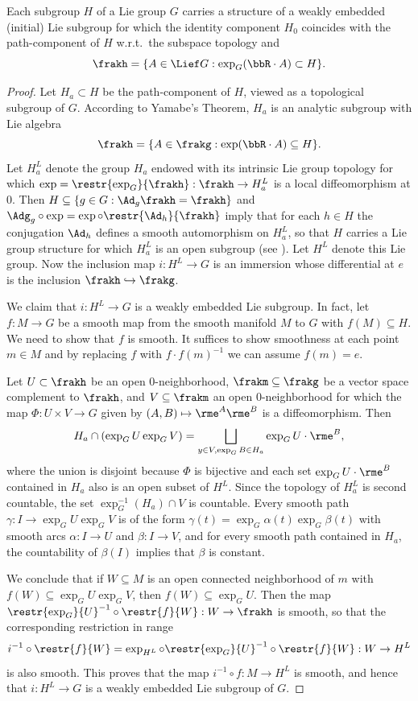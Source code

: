 \begin{thm}\label{thm initial subgroup}
    Each subgroup $H$ of a Lie group $G$ carries a structure of a weakly embedded (initial) Lie subgroup for which the identity component $H_0$ coincides with the path-component of $H$ w.r.t.\ the subspace topology and
    \[\frakh=\{A\in\Lief G: \exp_G(\bbR\cdot A)\subset H\}.\]
\end{thm}
\begin{proof}
    Let $H_a\subset H$ be the path-component of $H$, viewed as a topological subgroup of $G$. According to Yamabe's Theorem, $H_a$ is an analytic subgroup with Lie algebra
    \[\frakh=\{A\in\frakg:\exp(\bbR\cdot A)\subseteq H\}.\]
    Let $H_a^L$ denote the group $H_a$ endowed with its intrinsic Lie group topology for which $\exp=\restr{\exp_G}{\frakh}:\frakh\to H_a^L$ is a local diffeomorphism at $0$. Then $H\subseteq\{g\in G:\Ad_g\frakh=\frakh\}$ and $\Adg_g\circ \exp=\exp\circ\restr{\Ad_h}{\frakh}$ imply that for each $h\in H$ the conjugation $\Ad_h$ defines a smooth automorphism on $H_a^L$, so that $H$ carries a Lie group structure for which $H_a^L$ is an open subgroup (see \cite[Thm.~9.4.4, Cor.~9.4.5]{HN}). Let $H^L$ denote this Lie group. Now the inclusion map $i:H^L\to G$ is an immersion whose differential at $e$ is the inclusion $\frakh\hookrightarrow\frakg$.

    We claim that $i:H^L\to G$ is a weakly embedded Lie subgroup. In fact, let $f:M\to G$ be a smooth map from the smooth manifold $M$ to $G$ with $f(M)\subseteq H$. We need to show that $f$ is smooth. It suffices to show smoothness at each point $m\in M$ and by replacing $f$ with $f\cdot f(m)^{-1}$ we can assume $f(m)=e$.

    Let $U\subset \frakh$ be an open 0-neighborhood, $\frakm\subseteq\frakg$ be a vector space complement to $\frakh$, and $V\subseteq \frakm$ an open 0-neighborhood for which the map $\varPhi:U\times V\to G$ given by $(A,B)\mapsto \rme^A\rme^B$ is a diffeomorphism. Then 
    \[H_a\cap(\exp_G U\exp_G V)=\bigsqcup_{y\in V,\exp_G B\in H_a}\exp_GU \cdot \rme^B,\]
    where the union is disjoint because $\varPhi$ is bijective and each set $\exp_GU\cdot \rme^B$ contained in $H_a$ also is an open subset of $H^L$. Since the topology of $H^L_a$ is second countable, the set $\exp^{-1}_G(H_a)\cap V$ is countable. Every smooth path $\gamma:I\to \exp_GU\exp_GV$ is of the form $\gamma(t)=\exp_G\alpha(t)\exp_G\beta(t)$ with smooth arcs $\alpha:I\to U$ and $\beta:I\to V$, and for every smooth path contained in $H_a$, the countability of $\beta(I)$ implies that $\beta$ is constant.

    We conclude that if $W\subseteq M$ is an open connected neighborhood of $m$ with $f(W)\subseteq \exp_GU\exp_GV$, then $f(W)\subseteq \exp_GU$. Then the map $\restr{\exp_G}{U}^{-1}\circ \restr{f}{W}:W\to\frakh$ is smooth, so that the corresponding restriction in range
    \[i^{-1}\circ \restr{f}{W}=\exp_{H^L}\circ \restr{\exp_G}{U}^{-1}\circ \restr{f}{W}:W\to H^L\]
    is also smooth. This proves that the map $i^{-1}\circ f:M\to H^L$ is smooth, and hence that $i:H^L\to G$ is a weakly embedded Lie subgroup of $G$.
\end{proof}

